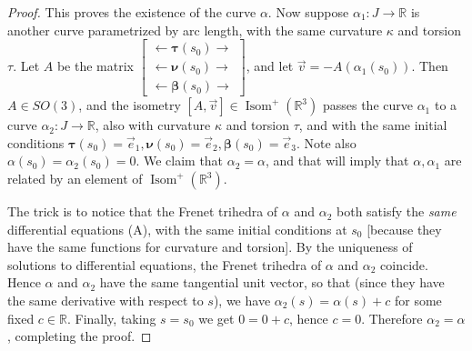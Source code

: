 \documentclass[leqno]{book}
\begin{document}
\begin{proof}
This proves the existence of the curve $\alpha$.  Now suppose $\alpha_1:J\to\mathbb R$ is another curve parametrized by arc length, with the same curvature $\kappa$ and torsion $\tau$.  Let $A$ be the matrix $\begin{bmatrix}\leftarrow\boldsymbol\tau(s_0)\rightarrow\\\leftarrow\boldsymbol\nu(s_0)\rightarrow\\\leftarrow\boldsymbol\beta(s_0)\rightarrow\end{bmatrix}$, and let $\vec v=-A(\alpha_1(s_0))$.  Then $A\in SO(3)$, and the isometry $[A,\vec v]\in\operatorname{Isom}^+(\mathbb R^3)$ passes the curve $\alpha_1$ to a curve $\alpha_2:J\to\mathbb R$, also with curvature $\kappa$ and torsion $\tau$, and with the same initial conditions $\boldsymbol\tau(s_0)=\vec e_1,\boldsymbol\nu(s_0)=\vec e_2,\boldsymbol\beta(s_0)=\vec e_3$.  Note also $\alpha(s_0)=\alpha_2(s_0)=0$.  We claim that $\alpha_2=\alpha$, and that will imply that $\alpha,\alpha_1$ are related by an element of $\operatorname{Isom}^+(\mathbb R^3)$.

The trick is to notice that the Frenet trihedra of $\alpha$ and $\alpha_2$ both satisfy the \emph{same} differential equations (A), with the same initial conditions at $s_0$ [because they have the same functions for curvature and torsion].  By the uniqueness of solutions to differential equations, the Frenet trihedra of $\alpha$ and $\alpha_2$ coincide.  Hence $\alpha$ and $\alpha_2$ have the same tangential unit vector, so that (since they have the same derivative with respect to $s$), we have $\alpha_2(s)=\alpha(s)+c$ for some fixed $c\in\mathbb R$.  Finally, taking $s=s_0$ we get $0=0+c$, hence $c=0$.  Therefore $\alpha_2=\alpha$, completing the proof.
\end{proof}
\end{document}
